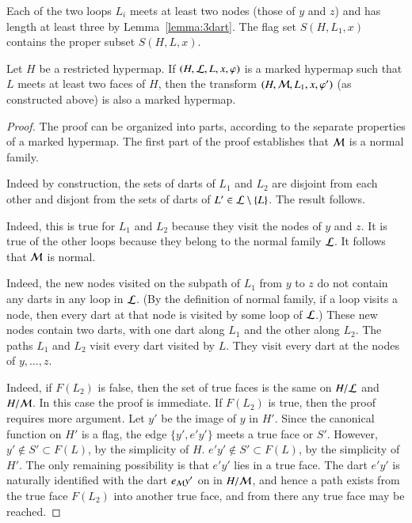 Each of the two
loops $L_i$ meets at least two nodes (those
of $y$ and $z$) and has length at least three by
Lemma~\ref{lemma:3dart}.  
The flag set $S(H,L_1,x)$ contains the proper subset $S(H,L,x)$.




\begin{lemma}[transform] 
Let $H$ be a restricted hypermap.
If $(H,{\cal L},L,x,\varphi)$ is a marked hypermap such that $L$
meets at least two faces of $H$,  then the transform
$(H,{\cal M},L_1,x,\varphi')$ (as constructed above)
is also a marked hypermap.
\end{lemma}

\begin{proof} The proof can be organized into parts, according
to the separate properties of a marked hypermap.
The first part of the proof establishes that ${\cal M}$ is a normal family.

 
Indeed by construction, the sets of darts of $L_1$ and $L_2$
are disjoint from each other and disjont from the sets of darts of $L'\in
{\cal L}\setminus \{L\}$.  The result follows.

   Indeed, this
is true for $L_1$ and $L_2$ because they visit the nodes of $y$ and
$z$.  It is true of the other loops because they belong to the
normal family ${\cal L}$. It follows that ${\cal M}$ is normal.

   Indeed, the new nodes visited on the
subpath of $L_1$ from $y$ to $z$ do not contain any darts in any
loop in ${\cal L}$.  (By the definition of normal family, if a loop
visits a node, then every dart at that node is visited by some loop
of ${\cal L}$.)  These new nodes contain two darts, with one dart
along $L_1$ and the other along $L_2$.  The paths $L_1$ and $L_2$
visit every dart visited by $L$.  They visit every dart at the nodes
of $y,\ldots,z$.

   Indeed, if $F(L_2)$ is
false, then the set of true faces is the same on $H/{\cal L}$ and
$H/{\cal M}$.  In this case the proof is immediate.  If $F(L_2)$ is
true, then the proof requires more argument.  Let $y'$ be the image
of $y$ in $H'$.  Since the canonical function on $H'$ is a flag, the
edge $\{y',e'y'\}$ meets a true face or $S'$.  However, $y'\not\in
S'\subset F(L)$, by the simplicity of $H$.  $e'y'\not\in S' \subset
F(L)$, by the simplicity of $H'$.  The only remaining possibility is
that $e'y'$ lies in a true face.  The dart $e'y'$ is naturally
identified with the dart $e_{\cal M} y'$ on in $H/{\cal M}$, and
hence a path exists from the true face $F(L_2)$ into another true
face, and from there any true face may be reached.


\end{proof}

